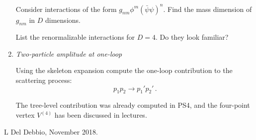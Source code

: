 \documentclass[12pt,a4paper]{article}
\newcommand{\psibar}{\bar{\psi}}
\begin{document}
\begin{enumerate}
  Consider interactions of the form $g_{nm} \phi^m
  (\psibar\psi)^n$. Find the mass dimension of $g_{nm}$ in $D$
  dimensions.
  
  List the renormalizable interactions for $D=4$. Do they look
  familiar? 

  \bigskip

\item {\it Two-particle amplitude at one-loop}

  Using the skeleton expansion compute the one-loop contribution to
  the scattering process:
  \[
    p_1 p_2 \rightarrow p_1' p_2'\, .
  \]

  The tree-level contribution was already computed in PS4, and the
  four-point vertex $V^{(4)}$ has been discussed in lectures.
  
\end{enumerate}

\vfill
\hspace*{\fill}\tiny L Del Debbio, November 2018.
\end{document}
